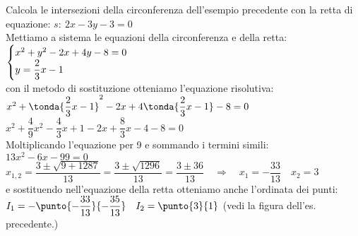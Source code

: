 \begin{esempio}
Calcola le intersezioni della circonferenza dell'esempio precedente con la 
retta di equazione: \(s:~2x -3y -3 = 0\)
\\[7pt]
Mettiamo a sistema le equazioni della circonferenza e della retta: \\[4pt]
\(\begin{cases}x^2 +y^2 -2x +4y -8 = 0 \\ y = \dfrac{2}{3}x -1\end{cases}\) 
\\[7pt]
con il metodo di sostituzione otteniamo l'equazione risolutiva: \\[4pt]
\(x^2 +\tonda{\dfrac{2}{3}x -1}^2 -2x +4\tonda{\dfrac{2}{3}x -1} -8 = 0\) \\[4pt]
\(x^2 +\dfrac{4}{9}x^2 - \dfrac{4}{3}x +1 -2x +\dfrac{8}{3}x -4 -8 = 0\) 
\\[7pt]
Moltiplicando l'equazione per 9 e sommando i termini simili:\\[4pt]
\(13x^2 -6x -99 = 0\) \\[4pt]
\(x_{1,2} = \dfrac{3 \pm \sqrt{9 +1287}}{13} = 
            \dfrac{3 \pm \sqrt{1296}}{13} = 
            \dfrac{3 \pm 36}{13} \quad \Rightarrow \quad x_1 = -\dfrac{33}{13} \quad x_2 = 3\) \\[7pt] 
e sostituendo nell'equazione della retta otteniamo anche l'ordinata dei 
punti: \\[4pt]
\(I_1 = - \punto{-\dfrac{33}{13}}{-\dfrac{35}{13}} \quad I_2 = \punto{3}{1}\)
\quad (vedi la figura dell'es. precedente.)

\end{esempio}

